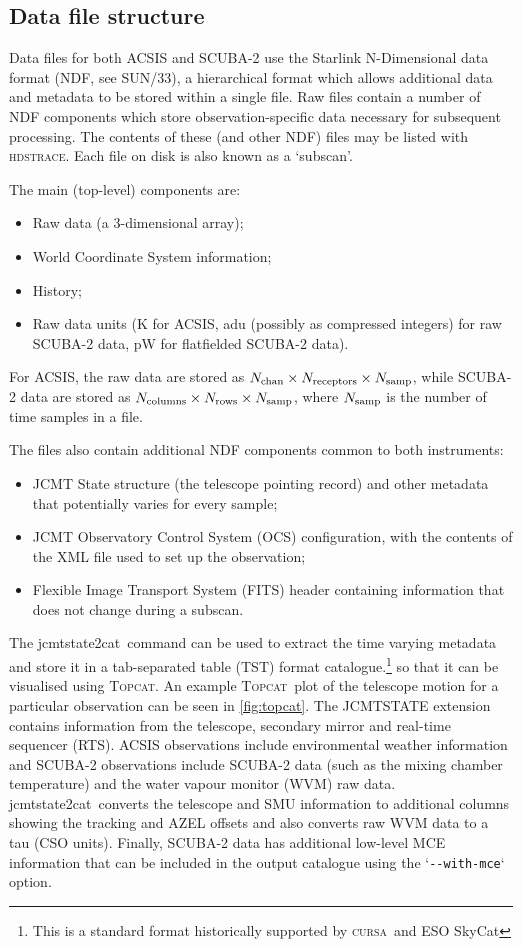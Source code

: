 \documentclass[twoside,11pt]{article}
\newcommand{\xref}[3]{#1}
\renewcommand{\_}{\texttt{\symbol{95}}}
\newcommand{\HDSTRACE}{\textsc{hdstrace}}
\newcommand{\HDSTRACEref}{\xref{\HDSTRACE}{sun102}{}}
\newcommand{\CURSA}{\xref{\textsc{cursa}}{sun190}{}}
\newcommand{\ndfref}{\xref{SUN/33}{sun33}{}}
\newcommand{\task}[1]{\textsf{#1}}
\newcommand{\jcmtstate}{\xref{\task{jcmtstate2cat}}{sun258}{JCMTSTATE2CAT}}
\newcommand{\topcat}{\xref{\textsc{Topcat}}{sun253}{}}
\begin{document}
\subsection{Data file structure}

Data files for both ACSIS and SCUBA-2 \cite{sc2ic01} use the Starlink N-Dimensional
data format (NDF, see \ndfref), a hierarchical format which allows
additional data and metadata to be stored within a single file. Raw
files contain a number of NDF components which store
observation-specific data necessary for subsequent processing. The
contents of these (and other NDF) files may be listed with
\HDSTRACEref. Each file on disk is also known as a `subscan'.

The main (top-level) components are:
\begin{itemize}
\item Raw data (a 3-dimensional array);
\item World Coordinate System information;
\item History;
\item Raw data units (K for ACSIS, adu (possibly as compressed integers) for raw SCUBA-2 data,
  pW for flatfielded SCUBA-2 data).
\end{itemize}
For ACSIS, the raw data are stored as $N_{\rm chan} \times N_{\rm
  receptors} \times N_{\rm samp}$, while SCUBA-2 data are stored as
$N_{\rm columns} \times N_{\rm rows} \times N_{\rm samp}$, where
$N_{\rm samp}$ is the number of time samples in a file.

The files also contain additional NDF components common to both
instruments:
\begin{itemize}
\item JCMT State structure (the telescope pointing record) and other
  metadata that potentially varies for every sample;
\item JCMT Observatory Control System (OCS) configuration, with the
  contents of the XML file used to set up the observation;
\item Flexible Image Transport System (FITS) header containing
  information that does not change during a subscan.
\end{itemize}

The \jcmtstate\ command can be used to extract the time varying
metadata and store it in a tab-separated table
(\xref{TST}{sun190}{ACCESS}) format catalogue.\footnote{This is a
  standard format historically supported by \CURSA\ and ESO SkyCat} so
that it can be visualised using \topcat. An example \topcat\ plot of the
telescope motion for a particular observation can be seen in
\ref{fig:topcat}. The JCMTSTATE extension contains information from
the telescope, secondary mirror and real-time sequencer (RTS). ACSIS
observations include environmental weather information and SCUBA-2
observations include SCUBA-2 data (such as the mixing chamber
temperature) and the water vapour monitor (WVM) raw data. \jcmtstate\
converts the telescope and SMU information to additional columns
showing the tracking and AZEL offsets and also converts raw WVM data
to a tau (CSO units). Finally, SCUBA-2 data has additional low-level
MCE information that can be included in the output catalogue using the
`\verb+--with-mce+` option.
\end{document}
